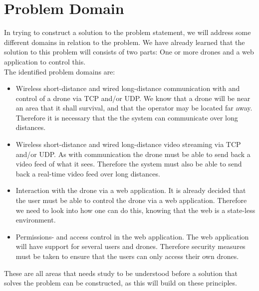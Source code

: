 \section{Problem Domain}
In trying to construct a solution to the problem statement, we will address some different domains in relation to the problem. We have already learned that the solution to this problem will consists of two parts: One or more drones and a web application to control this. \\

The identified problem domains are:
\begin{itemize}
	\item Wireless short-distance and wired long-distance communication with and control of a drone via TCP and/or UDP. We know that a drone will be near an area that it shall survival, and that the operator may be located far away. Therefore it is necessary that the the system can communicate over long distances. 
	\item Wireless short-distance and wired long-distance video streaming via TCP and/or UDP. As with communication the drone must be able to send back a video feed of what it sees. Therefore the system must also be able to send back a real-time video feed over long distances. 
	\item Interaction with the drone via a web application. It is already decided that the user must be able to control the drone via a web application. Therefore we need to look into how one can do this, knowing that the web is a state-less environment. 
	\item Permissions- and access control in the web application. The web application will have support for several users and drones. Therefore security measures must be taken to ensure that the users can only access their own drones.
\end{itemize}

These are all areas that needs study to be understood before a solution that solves the problem can be constructed, as this will build on these principles.

